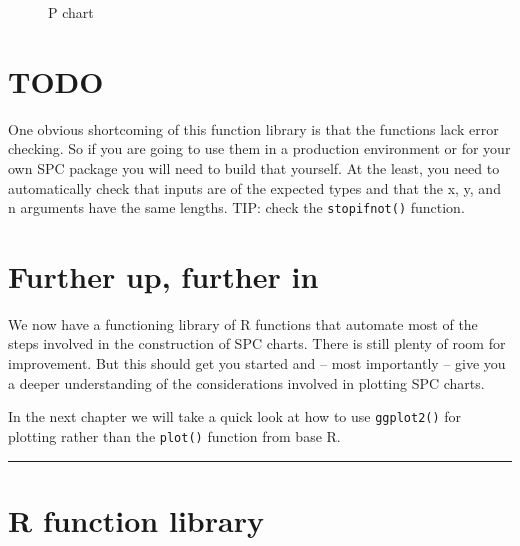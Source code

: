 \documentclass[
]{book}
\makeatletter
\newcommand*\pandocbounded[1]{%
  \sbox\pandoc@box{#1}%
  \Gscale@div\@tempa{\textheight}{\dimexpr\ht\pandoc@box+\dp\pandoc@box\relax}%
  \Gscale@div\@tempb{\linewidth}{\wd\pandoc@box}%
  \ifdim\@tempb\p@<\@tempa\p@\let\@tempa\@tempb\fi%
  \ifdim\@tempa\p@<\p@\scalebox{\@tempa}{\usebox\pandoc@box}%
  \else\usebox{\pandoc@box}%
  \fi%
}
\makeatother
\begin{document}
\begin{figure}
\centering
\pandocbounded{}
\caption{\label{fig:rfun-p}P chart}
\end{figure}

\section{TODO}\label{todo}

One obvious shortcoming of this function library is that the functions lack error checking. So if you are going to use them in a production environment or for your own SPC package you will need to build that yourself. At the least, you need to automatically check that inputs are of the expected types and that the x, y, and n arguments have the same lengths. TIP: check the \texttt{stopifnot()} function.

\section{Further up, further in}\label{further-up-further-in}

We now have a functioning library of R functions that automate most of the steps involved in the construction of SPC charts. There is still plenty of room for improvement. But this should get you started and -- most importantly -- give you a deeper understanding of the considerations involved in plotting SPC charts.

In the next chapter we will take a quick look at how to use \texttt{ggplot2()} for plotting rather than the \texttt{plot()} function from base R.

\begin{center}\rule{0.5\linewidth}{0.5pt}\end{center}

\section*{R function library}\label{funs}
\end{document}
